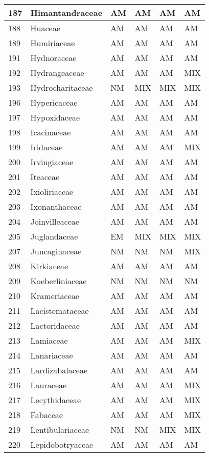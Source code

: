 \documentclass[]{article}
\begin{document}
\begin{longtable}{l|l|l|l|l|l}
\hline
187 & Himantandraceae & AM & AM & AM & AM\\
\hline
188 & Huaceae & AM & AM & AM & AM\\
\hline
189 & Humiriaceae & AM & AM & AM & AM\\
\hline
191 & Hydnoraceae & AM & AM & AM & AM\\
\hline
192 & Hydrangeaceae & AM & AM & AM & MIX\\
\hline
193 & Hydrocharitaceae & NM & MIX & MIX & MIX\\
\hline
196 & Hypericaceae & AM & AM & AM & AM\\
\hline
197 & Hypoxidaceae & AM & AM & AM & AM\\
\hline
198 & Icacinaceae & AM & AM & AM & AM\\
\hline
199 & Iridaceae & AM & AM & AM & MIX\\
\hline
200 & Irvingiaceae & AM & AM & AM & AM\\
\hline
201 & Iteaceae & AM & AM & AM & AM\\
\hline
202 & Ixioliriaceae & AM & AM & AM & AM\\
\hline
203 & Ixonanthaceae & AM & AM & AM & AM\\
\hline
204 & Joinvilleaceae & AM & AM & AM & AM\\
\hline
205 & Juglandaceae & EM & MIX & MIX & MIX\\
\hline
207 & Juncaginaceae & NM & NM & NM & MIX\\
\hline
208 & Kirkiaceae & AM & AM & AM & AM\\
\hline
209 & Koeberliniaceae & NM & NM & NM & NM\\
\hline
210 & Krameriaceae & AM & AM & AM & AM\\
\hline
211 & Lacistemataceae & AM & AM & AM & AM\\
\hline
212 & Lactoridaceae & AM & AM & AM & AM\\
\hline
213 & Lamiaceae & AM & AM & AM & MIX\\
\hline
214 & Lanariaceae & AM & AM & AM & AM\\
\hline
215 & Lardizabalaceae & AM & AM & AM & AM\\
\hline
216 & Lauraceae & AM & AM & AM & MIX\\
\hline
217 & Lecythidaceae & AM & AM & AM & MIX\\
\hline
218 & Fabaceae & AM & AM & AM & MIX\\
\hline
219 & Lentibulariaceae & NM & NM & MIX & MIX\\
\hline
220 & Lepidobotryaceae & AM & AM & AM & AM\\

\end{longtable}
\end{document}

